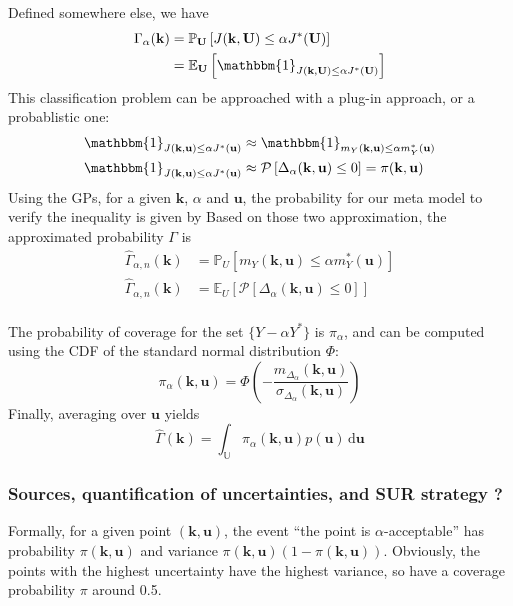 \documentclass[a4paper,11pt]{article}
\newcommand{\Ex}{\mathbb{E}}
\newcommand{\Prob}{\mathbb{P}}
\newcommand{\ProbGP}{\mathcal{P}}
\newcommand{\Uspace}{\mathbb{U}}
\begin{document}
Defined somewhere else, we have
\begin{align}
  \Gamma_{\alpha}(\mathbf{k}) &= \Prob_{\mathbf{U}}\left[J(\mathbf{k},\mathbf{U}) \leq \alpha J^*(\mathbf{U})\right] \\
                              & =\Ex_{\mathbf{U}}\left[\mathbbm{1}_{J(\mathbf{k},\mathbf{U}) \leq \alpha J^*(\mathbf{U})}\right]
\end{align}
This classification problem can be approached with a plug-in approach, or a probablistic one:
\begin{align}
  \mathbbm{1}_{J(\mathbf{k},\mathbf{u}) \leq \alpha J^*(\mathbf{u})} &\approx   \mathbbm{1}_{m_Y(\mathbf{k},\mathbf{u}) \leq \alpha m_Y^*(\mathbf{u})} \\
  \mathbbm{1}_{J(\mathbf{k},\mathbf{u}) \leq \alpha J^*(\mathbf{u})} &\approx   \ProbGP\left[ \Delta_{\alpha}(\mathbf{k},\mathbf{u}) \leq 0 \right] = \pi(\mathbf{k},\mathbf{u})
\end{align}
Using the GPs, for a given $\mathbf{k}$, $\alpha$ and $\mathbf{u}$, the probability for our meta model to verify the inequality is given by
Based on those two approximation, the approximated probability $\Gamma$ is
\begin{align}
  \hat{\Gamma}_{\alpha, n}(\mathbf{k}) &= \Prob_U\left[m_Y(\mathbf{k},\mathbf{u}) \leq \alpha m_Y^*(\mathbf{u}) \right] \tag{plug-in} \\
  \hat{\Gamma}_{\alpha, n}(\mathbf{k}) &= \Ex_U\left[ \ProbGP\left[ \Delta_{\alpha}(\mathbf{k},\mathbf{u}) \leq 0\right]\right] \tag{Probabilistic approx} \\
\end{align}

The probability of coverage for the set $\{Y - \alpha Y^*\}$ is $\pi_{\alpha}$, and can be computed using the CDF of the standard normal distribution $\Phi$:
\begin{equation}
  \pi_{\alpha}(\mathbf{k},\mathbf{u}) = \Phi\left(-\frac{m_{\Delta_\alpha}(\mathbf{k},\mathbf{u})}{\sigma_{\Delta_\alpha}(\mathbf{k},\mathbf{u})}\right)
\end{equation}
Finally, averaging over $\mathbf{u}$ yields
\begin{equation}
  \hat{\Gamma}(\mathbf{k}) = \int_{\Uspace}\pi_{\alpha}(\mathbf{k},\mathbf{u})p(\mathbf{u}) \,\mathrm{d}\mathbf{u}
\end{equation}
\subsubsection{Sources, quantification of uncertainties, and SUR strategy ?}

Formally, for a given point $(\mathbf{k},\mathbf{u})$, the event ``the point is $\alpha$-acceptable'' has probability $\pi(\mathbf{k},\mathbf{u})$ and variance $\pi(\mathbf{k},\mathbf{u}) (1-\pi(\mathbf{k},\mathbf{u}))$. Obviously, the points with the highest uncertainty have the highest variance, so have a coverage probability $\pi$ around 0.5.
\end{document}
